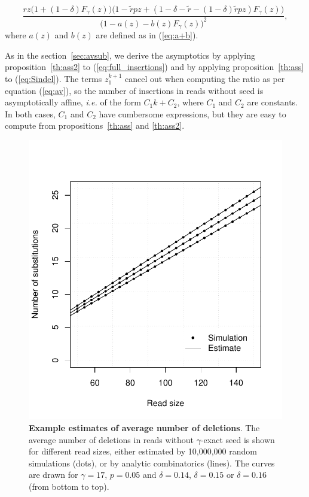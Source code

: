 \documentclass{article}
\begin{document}
\begin{equation}
\label{eq:full_insertions}
\frac{rz\big(1+(1-\delta)F_\gamma(z)\big)
\big(1-\tilde{r}pz+(1-\delta-\tilde{r}-(1-\delta)\tilde{r}pz)
  F_\gamma(z)\big)}
  {\big(1-a(z)-b(z)F_\gamma(z)\big)^2},
\end{equation}
where $a(z)$ and $b(z)$ are defined as in (\ref{eq:a+b}).

As in the section~\ref{sec:avsub}, we derive the asymptotics by applying
proposition~\ref{th:ass2} to (\ref{eq:full_insertions}) and by applying
proposition~\ref{th:ass} to (\ref{eq:Sindel}). The terms $z_1^{k+1}$ cancel
out when computing the ratio as per equation (\ref{eq:av}), so the number
of insertions in reads without seed is asymptotically affine,
\textit{i.e.} of the form $C_1k+C_2$, where $C_1$ and $C_2$ are constants.
In both cases, $C_1$ and $C_2$ have cumbersome expressions, but they are
easy to compute from propositions~\ref{th:ass} and \ref{th:ass2}.

\begin{figure}[h]
\centering
\includegraphics[scale=0.445]{simuldel-average2.pdf}
\caption{\textbf{Example estimates of average number of deletions}. The
average number of deletions in reads without $\gamma$-exact seed is
shown for different read sizes, either estimated by 10,000,000 random
simulations (dots), or by analytic combinatorics (lines). The curves are
drawn for $\gamma=17$, $p=0.05$ and $\delta=0.14$, $\delta=0.15$ or
$\delta=0.16$ (from bottom to top).}
\label{fig:simulavins}
\end{figure}
\end{document}
